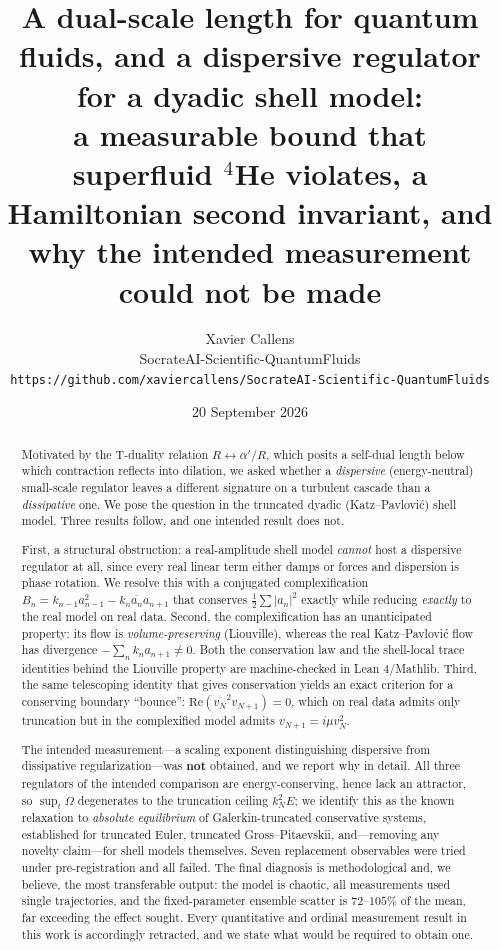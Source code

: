 \documentclass[11pt,a4paper]{article}
\title{\textbf{A dual-scale length for quantum fluids, and a dispersive regulator for a
dyadic shell model:}\\
\large a measurable bound that superfluid $^4$He violates, a Hamiltonian second invariant,
and why the intended measurement could not be made}
\author{Xavier Callens\\
\small SocrateAI-Scientific-QuantumFluids\\
\small \texttt{https://github.com/xaviercallens/SocrateAI-Scientific-QuantumFluids}}
\date{20 September 2026}
\theoremstyle{definition}
\theoremstyle{remark}
\newcommand{\conj}[1]{\overline{#1}}
\begin{document}
\maketitle

\begin{abstract}
\noindent
Motivated by the T-duality relation $R \leftrightarrow \alpha'/R$, which posits a
self-dual length below which contraction reflects into dilation, we asked whether a
\emph{dispersive} (energy-neutral) small-scale regulator leaves a different signature on a
turbulent cascade than a \emph{dissipative} one. We pose the question in the truncated
dyadic (Katz--Pavlovi\'c) shell model. Three results follow, and one intended result does
not.

First, a structural obstruction: a real-amplitude shell model \emph{cannot} host a
dispersive regulator at all, since every real linear term either damps or forces and
dispersion is phase rotation. We resolve this with a conjugated complexification
$B_n = k_{n-1}a_{n-1}^2 - k_n\conj{a_n}a_{n+1}$ that conserves $\tfrac12\sum|a_n|^2$
exactly while reducing \emph{exactly} to the real model on real data. Second, the
complexification has an unanticipated property: its flow is \emph{volume-preserving}
(Liouville), whereas the real Katz--Pavlovi\'c flow has divergence $-\sum_n k_n a_{n+1}
\neq 0$. Both the conservation law and the shell-local trace identities behind the
Liouville property are machine-checked in Lean 4/Mathlib. Third, the same telescoping
identity that gives conservation yields an exact criterion for a conserving boundary
``bounce'': $\mathrm{Re}(\conj{v_N}^2 v_{N+1}) = 0$, which on real data admits only
truncation but in the complexified model admits $v_{N+1} = i\mu v_N^2$.

The intended measurement---a scaling exponent distinguishing dispersive from dissipative
regularization---was \textbf{not} obtained, and we report why in detail. All three
regulators of the intended comparison are energy-conserving, hence lack an attractor, so
$\sup_t\Omega$ degenerates to the truncation ceiling $k_N^2E$; we identify this as the
known relaxation to \emph{absolute equilibrium} of Galerkin-truncated conservative
systems, established for truncated Euler, truncated Gross--Pitaevskii, and---removing any
novelty claim---for shell models themselves. Seven replacement observables were tried
under pre-registration and all failed. The final diagnosis is methodological and, we
believe, the most transferable output: the model is chaotic, all measurements used single
trajectories, and the fixed-parameter ensemble scatter is $72$--$105\%$ of the mean, far
exceeding the effect sought. Every quantitative and ordinal measurement result in this
work is accordingly retracted, and we state what would be required to obtain one.


\end{abstract}
\end{document}
